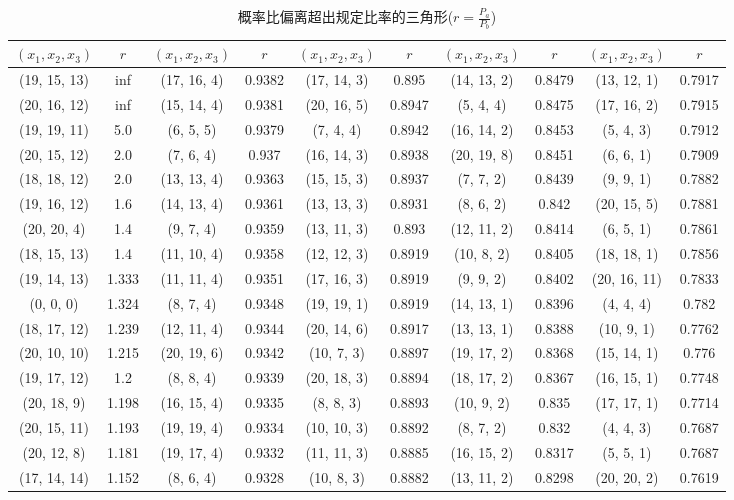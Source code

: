 \documentclass[UTF8]{ctexart}
\begin{document}
\begin{longtable}[H]{|cc|cc|cc|cc|cc|}
    \caption{概率比偏离超出规定比率的三角形($r=\frac{P_a}{P_b}$)}\\
        \hline
        $(x_1,x_2,x_3)$ & $r$ & $(x_1,x_2,x_3)$ & $r$ & $(x_1,x_2,x_3)$ & $r$ & $(x_1,x_2,x_3)$ & $r$ & $(x_1,x_2,x_3)$ & $r$\\
        \hline
        (19, 15, 13)&inf&(17, 16, 4)&0.9382&(17, 14, 3)&0.895&(14, 13, 2)&0.8479&(13, 12, 1)&0.7917\\
(20, 16, 12)&inf&(15, 14, 4)&0.9381&(20, 16, 5)&0.8947&(5, 4, 4)&0.8475&(17, 16, 2)&0.7915\\
(19, 19, 11)&5.0&(6, 5, 5)&0.9379&(7, 4, 4)&0.8942&(16, 14, 2)&0.8453&(5, 4, 3)&0.7912\\
(20, 15, 12)&2.0&(7, 6, 4)&0.937&(16, 14, 3)&0.8938&(20, 19, 8)&0.8451&(6, 6, 1)&0.7909\\
(18, 18, 12)&2.0&(13, 13, 4)&0.9363&(15, 15, 3)&0.8937&(7, 7, 2)&0.8439&(9, 9, 1)&0.7882\\
(19, 16, 12)&1.6&(14, 13, 4)&0.9361&(13, 13, 3)&0.8931&(8, 6, 2)&0.842&(20, 15, 5)&0.7881\\
(20, 20, 4)&1.4&(9, 7, 4)&0.9359&(13, 11, 3)&0.893&(12, 11, 2)&0.8414&(6, 5, 1)&0.7861\\
(18, 15, 13)&1.4&(11, 10, 4)&0.9358&(12, 12, 3)&0.8919&(10, 8, 2)&0.8405&(18, 18, 1)&0.7856\\
(19, 14, 13)&1.333&(11, 11, 4)&0.9351&(17, 16, 3)&0.8919&(9, 9, 2)&0.8402&(20, 16, 11)&0.7833\\
(0, 0, 0)&1.324&(8, 7, 4)&0.9348&(19, 19, 1)&0.8919&(14, 13, 1)&0.8396&(4, 4, 4)&0.782\\
(18, 17, 12)&1.239&(12, 11, 4)&0.9344&(20, 14, 6)&0.8917&(13, 13, 1)&0.8388&(10, 9, 1)&0.7762\\
(20, 10, 10)&1.215&(20, 19, 6)&0.9342&(10, 7, 3)&0.8897&(19, 17, 2)&0.8368&(15, 14, 1)&0.776\\
(19, 17, 12)&1.2&(8, 8, 4)&0.9339&(20, 18, 3)&0.8894&(18, 17, 2)&0.8367&(16, 15, 1)&0.7748\\
(20, 18, 9)&1.198&(16, 15, 4)&0.9335&(8, 8, 3)&0.8893&(10, 9, 2)&0.835&(17, 17, 1)&0.7714\\
(20, 15, 11)&1.193&(19, 19, 4)&0.9334&(10, 10, 3)&0.8892&(8, 7, 2)&0.832&(4, 4, 3)&0.7687\\
(20, 12, 8)&1.181&(19, 17, 4)&0.9332&(11, 11, 3)&0.8885&(16, 15, 2)&0.8317&(5, 5, 1)&0.7687\\
(17, 14, 14)&1.152&(8, 6, 4)&0.9328&(10, 8, 3)&0.8882&(13, 11, 2)&0.8298&(20, 20, 2)&0.7619\\

\end{longtable}
\end{document}
